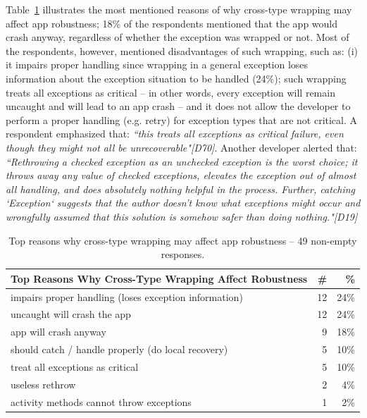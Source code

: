  Table~\ref{tab:robustness} illustrates the  most mentioned reasons of why cross-type wrapping may affect app robustness; 18\% of the respondents mentioned that the app would crash anyway, regardless of whether the exception was wrapped or not. Most of the respondents, however, mentioned disadvantages of such wrapping, such as: (i) it impairs proper handling since wrapping in a general exception loses information about the exception situation to be handled (24\%); such wrapping treats all exceptions as critical -- in other words, every exception will remain uncaught and will lead to an app crash -- and it does not allow the developer to perform a proper handling (e.g. retry) for exception types that are not critical. A respondent emphasized that: \emph{``this treats all exceptions as critical failure, even though they might not all be unrecoverable"[D70]}. Another developer alerted that: \emph{``Rethrowing a checked exception as an unchecked exception is the worst choice; it throws away any value of checked exceptions, elevates the exception out of almost all handling, and does absolutely nothing helpful in the process. Further, catching `Exception` suggests that the author doesn't know what exceptions might occur and wrongfully assumed that this solution is somehow safer than doing nothing."[D19]}		

\bigskip

 

\begin{table}
\scriptsize
\centering
\begin{tabular}{lrr}
\hline
\bfseries{Top Reasons Why Cross-Type Wrapping Affect Robustness} & \bfseries{\#} & \bfseries{\%} \\
\hline
impairs proper handling (loses exception information)	& 12 &	24\% \\
uncaught will crash the app	& 12 &	24\% \\
app will crash anyway	& 9	& 18\% \\
should catch / handle properly (do local recovery)	 & 5 & 	10\% \\
treat all exceptions as critical	& 5 &	10\% \\
useless rethrow	& 2 &	4\% \\
activity methods cannot throw exceptions &	1 &	2\% \\

\hline
\end{tabular}
\caption{Top reasons why cross-type wrapping may affect app robustness -- 49 non-empty responses. }
\label{tab:robustness}
\end{table}


